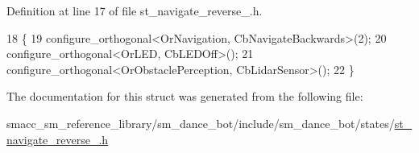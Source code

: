 Definition at line 17 of file st\+\_\+navigate\+\_\+reverse\+\_.\+h.


\begin{DoxyCode}
18    \{
19       configure\_orthogonal<OrNavigation, CbNavigateBackwards>(2);
20       configure\_orthogonal<OrLED, CbLEDOff>();
21       configure\_orthogonal<OrObstaclePerception, CbLidarSensor>();
22    \}
\end{DoxyCode}


The documentation for this struct was generated from the following file\+:\begin{DoxyCompactItemize}
\item 
smacc\+\_\+sm\+\_\+reference\+\_\+library/sm\+\_\+dance\+\_\+bot/include/sm\+\_\+dance\+\_\+bot/states/\hyperlink{include_2sm__dance__bot_2states_2st__navigate__reverse__2_8h}{st\+\_\+navigate\+\_\+reverse\+\_.\+h}\end{DoxyCompactItemize}
